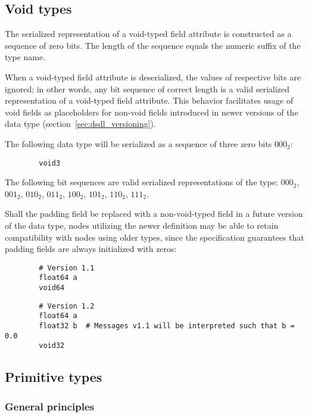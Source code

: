 \subsection{Void types}\label{sec:dsdl_serialized_void}

The serialized representation of a void-typed field attribute is constructed as a sequence of zero bits.
The length of the sequence equals the numeric suffix of the type name.

When a void-typed field attribute is deserialized, the values of respective bits are ignored;
in other words, any bit sequence of correct length is a valid serialized representation
of a void-typed field attribute.
This behavior facilitates usage of void fields as placeholders for non-void fields
introduced in newer versions of the data type (section~\ref{sec:dsdl_versioning}).

\begin{remark}
    The following data type will be serialized as a sequence of three zero bits $000_2$:
    \begin{verbatim}
        void3
    \end{verbatim}
    The following bit sequences are valid serialized representations of the type:
    $000_2$,
    $001_2$,
    $010_2$,
    $011_2$,
    $100_2$,
    $101_2$,
    $110_2$,
    $111_2$.

    Shall the padding field be replaced with a non-void-typed field in a future version of the data type,
    nodes utilizing the newer definition may be able to retain compatibility with nodes using older types,
    since the specification guarantees that padding fields are always initialized with zeros:

    \begin{verbatim}
        # Version 1.1
        float64 a
        void64
    \end{verbatim}

    \begin{verbatim}
        # Version 1.2
        float64 a
        float32 b  # Messages v1.1 will be interpreted such that b = 0.0
        void32
    \end{verbatim}
\end{remark}

\subsection{Primitive types}

\subsubsection{General principles}

